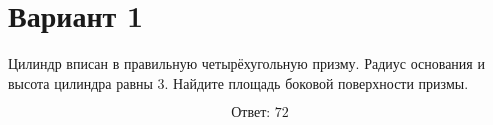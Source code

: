\documentclass[12pt,a4paper]{article}
\begin{document}
\section*{Вариант 1}

Цилиндр вписан в правильную четырёхугольную призму. Радиус основания и высота цилиндра равны 3. Найдите площадь боковой поверхности призмы.

\begin{center}
\end{center}

\[
\boxed{\text{Ответ: }72}
\]
\end{document}
